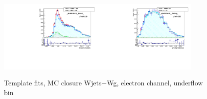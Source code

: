 \begin{figure}[htb]
  \begin{center}
   \includegraphics[width=0.45\textwidth]{../figs/figs_v11/ELECTRON_WGamma/MCclosureWjetsPlusWg/c_TEMPL_SIHIH_UNblind__phoEt10to15__Barrel__RooFit_MCclosure.pdf}\includegraphics[width=0.45\textwidth]{../figs/figs_v11/ELECTRON_WGamma/MCclosureWjetsPlusWg/c_TEMPL_SIHIH_UNblind__phoEt10to15__Endcap__RooFit_MCclosure.pdf}\\
  \label{fig:templateFits_MCclosureWjetsPlusWg_SIHIH_ELECTRON_0}
  \caption{Template fits, MC closure Wjets+Wg, electron channel, underflow bin}
  \end{center}
\end{figure}

\


